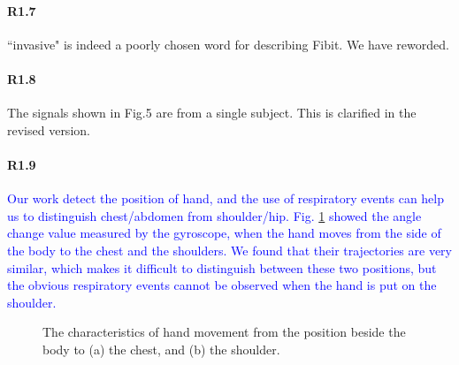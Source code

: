 \paragraph{R1.7} ``invasive" is indeed a poorly chosen word for describing Fibit. We have reworded.
\vspace{-2mm}
\paragraph{R1.8} The signals shown in Fig.5 are from a single subject. This is clarified in the revised version.

\paragraph{R1.9} \textcolor{blue}{Our work detect the position of hand, and the use of respiratory events can help us to distinguish chest/abdomen from shoulder/hip. Fig. \ref{Bodyhand} showed the angle change value measured by the gyroscope, when the hand moves from the side of the body to the chest and the shoulders. We found that their trajectories are very similar, which makes it difficult to distinguish between these two positions, but the obvious respiratory events cannot be observed when the hand is put on the shoulder.}

\begin{figure}[!t]
	\centering
	\caption{The characteristics of hand movement from the position beside the body  to (a)  the chest, and (b) the shoulder.}\label{Bodyhand}
\end{figure}


